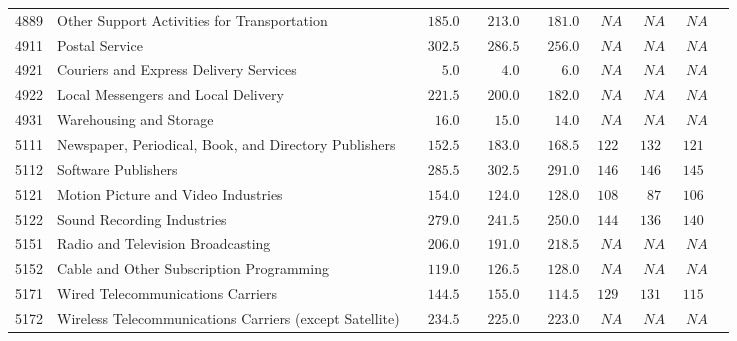 \documentclass[9pt, oneside]{article}   	%
\begin{document}
\begin{longtable}{lp{3.5 in}ccccccc}
4889  & Other Support Activities for Transportation & $\phantom{00}185.0$ & $\phantom{00}213.0$ & $\phantom{00}181.0$ & $\phantom{0}NA$ & $\phantom{0}NA$ & $\phantom{0}NA$ \\
4911  & Postal Service & $\phantom{00}302.5$ & $\phantom{00}286.5$ & $\phantom{00}256.0$ & $\phantom{0}NA$ & $\phantom{0}NA$ & $\phantom{0}NA$ \\
4921  & Couriers and Express Delivery Services & $\phantom{0000}5.0$ & $\phantom{0000}4.0$ & $\phantom{0000}6.0$ & $\phantom{0}NA$ & $\phantom{0}NA$ & $\phantom{0}NA$ \\
4922  & Local Messengers and Local Delivery & $\phantom{00}221.5$ & $\phantom{00}200.0$ & $\phantom{00}182.0$ & $\phantom{0}NA$ & $\phantom{0}NA$ & $\phantom{0}NA$ \\
4931  & Warehousing and Storage & $\phantom{000}16.0$ & $\phantom{000}15.0$ & $\phantom{000}14.0$ & $\phantom{0}NA$ & $\phantom{0}NA$ & $\phantom{0}NA$ \\
5111  & Newspaper, Periodical, Book, and Directory Publishers & $\phantom{00}152.5$ & $\phantom{00}183.0$ & $\phantom{00}168.5$ & $122$ & $132$ & $121$ \\
5112  & Software Publishers & $\phantom{00}285.5$ & $\phantom{00}302.5$ & $\phantom{00}291.0$ & $146$ & $146$ & $145$ \\
5121  & Motion Picture and Video Industries & $\phantom{00}154.0$ & $\phantom{00}124.0$ & $\phantom{00}128.0$ & $108$ & $\phantom{0}87$ & $106$ \\
5122  & Sound Recording Industries & $\phantom{00}279.0$ & $\phantom{00}241.5$ & $\phantom{00}250.0$ & $144$ & $136$ & $140$ \\
5151  & Radio and Television Broadcasting & $\phantom{00}206.0$ & $\phantom{00}191.0$ & $\phantom{00}218.5$ & $\phantom{0}NA$ & $\phantom{0}NA$ & $\phantom{0}NA$ \\
5152  & Cable and Other Subscription Programming & $\phantom{00}119.0$ & $\phantom{00}126.5$ & $\phantom{00}128.0$ & $\phantom{0}NA$ & $\phantom{0}NA$ & $\phantom{0}NA$ \\
5171  & Wired Telecommunications Carriers & $\phantom{00}144.5$ & $\phantom{00}155.0$ & $\phantom{00}114.5$ & $129$ & $131$ & $115$ \\
5172  & Wireless Telecommunications Carriers (except Satellite) & $\phantom{00}234.5$ & $\phantom{00}225.0$ & $\phantom{00}223.0$ & $\phantom{0}NA$ & $\phantom{0}NA$ & $\phantom{0}NA$ \\

\end{longtable}
\end{document}
